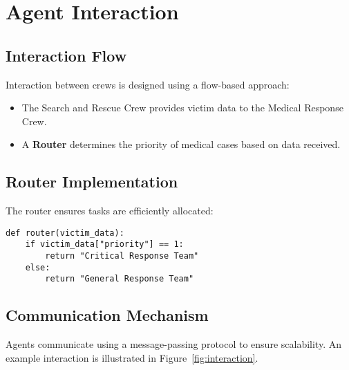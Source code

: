 \section{Agent Interaction}
\subsection{Interaction Flow}
Interaction between crews is designed using a flow-based approach:
\begin{itemize}
    \item The Search and Rescue Crew provides victim data to the Medical Response Crew.
    \item A \textbf{Router} determines the priority of medical cases based on data received.
\end{itemize}

\subsection{Router Implementation}
The router ensures tasks are efficiently allocated:
\begin{lstlisting}[caption={Router Implementation for Task Allocation}]
def router(victim_data):
    if victim_data["priority"] == 1:
        return "Critical Response Team"
    else:
        return "General Response Team"
\end{lstlisting}

\subsection{Communication Mechanism}
Agents communicate using a message-passing protocol to ensure scalability. An example interaction is illustrated in Figure~\ref{fig:interaction}.

\begin{comment}
\begin{figure}[H]
\centering
\texttt{[image: interaction\_flow.png]}
\caption{Interaction Flow Between Crews}
\label{fig:interaction}
\end{figure}
\end{comment}